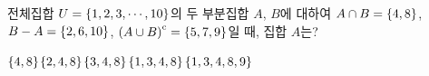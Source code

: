 전체집합 $U=\{1{,}\mkern3mu\mathopen{}2{,}\mkern3mu\mathopen{}3{,}\mkern3mu\mathopen{}\cdots{,}\mkern3mu\mathopen{}10\}$의 두 부분집합 $A$, $B$에 대하여 $A\cap B=\{4{,}\mkern3mu\mathopen{}8\}$, $B-A=\{2{,}\mkern3mu\mathopen{}6{,}\mkern3mu\mathopen{}10\}$, ${(A\cup B)}^{\mathrm{c}}=\{5{,}\mkern3mu\mathopen{}7{,}\mkern3mu\mathopen{}9\}$일 때, 집합 $A$는?
\begin{choicesii}{$\{4{,}\mkern3mu\mathopen{}8\}$}{$\{2{,}\mkern3mu\mathopen{}4{,}\mkern3mu\mathopen{}8\}$}{$\{3{,}\mkern3mu\mathopen{}4{,}\mkern3mu\mathopen{}8\}$}{$\{1{,}\mkern3mu\mathopen{}3{,}\mkern3mu\mathopen{}4{,}\mkern3mu\mathopen{}8\}$}{$\{1{,}\mkern3mu\mathopen{}3{,}\mkern3mu\mathopen{}4{,}\mkern3mu\mathopen{}8{,}\mkern3mu\mathopen{}9\}$}\end{choicesii}
